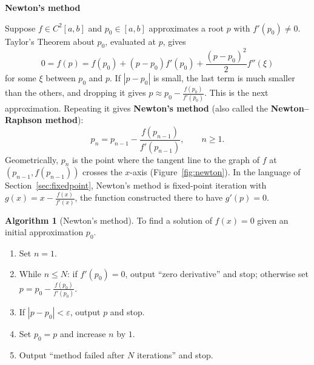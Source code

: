 \documentclass[11pt,a4paper]{article}
\numberwithin{equation}{section}
\theoremstyle{definition}
\newtheorem{alg}[thm]{Algorithm}
\newcommand{\subhead}[1]{%
  \par\medskip\noindent\textbf{#1}\par\nobreak\smallskip}
\begin{document}
\subhead{Newton's method}
Suppose $f\in C^2[a,b]$ and $p_0\in[a,b]$ approximates a root $p$ with $f'(p_0)\neq0$. Taylor's Theorem about $p_0$, evaluated at $p$, gives
$$0 = f(p) = f(p_0)+(p-p_0)f'(p_0)+\frac{(p-p_0)^2}{2}f''(\xi)$$
for some $\xi$ between $p_0$ and $p$. If $|p-p_0|$ is small, the last term is much smaller than the others, and dropping it gives
$p\approx p_0-\frac{f(p_0)}{f'(p_0)}$. This is the next approximation. Repeating it gives \textbf{Newton's method} (also called the
\textbf{Newton--Raphson method}):
\begin{equation}\label{eq:newton}
p_n = p_{n-1}-\frac{f(p_{n-1})}{f'(p_{n-1})},\qquad n\geq1 .
\end{equation}
Geometrically, $p_n$ is the point where the tangent line to the graph of $f$ at $(p_{n-1},f(p_{n-1}))$ crosses the $x$-axis
(Figure~\ref{fig:newton}). In the language of Section~\ref{sec:fixedpoint}, Newton's method is fixed-point iteration with
$g(x) = x-\frac{f(x)}{f'(x)}$, the function constructed there to have $g'(p) = 0$.

\begin{alg}[Newton's method]
\label{alg:newton}
To find a solution of $f(x) = 0$ given an initial approximation $p_0$.
\begin{enumerate}[label=Step \arabic*:,leftmargin=*]
\item Set $n = 1$.
\item While $n\leq N$: if $f'(p_0) = 0$, output ``zero derivative'' and stop; otherwise set $p = p_0-\frac{f(p_0)}{f'(p_0)}$.
\item If $|p-p_0|<\varepsilon$, output $p$ and stop.
\item Set $p_0 = p$ and increase $n$ by $1$.
\item Output ``method failed after $N$ iterations'' and stop.
\end{enumerate}
\end{alg}
\end{document}
